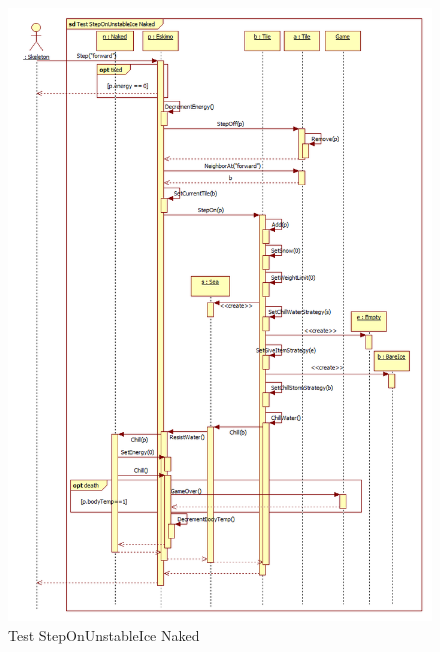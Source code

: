 \begin{figure}[h]
	\begin{center}
		\includegraphics[width=17cm]{chapters/chapter05/diagrams/Test_StepOnUnstableIce_Naked.png}
		\caption{Test StepOnUnstableIce Naked}
		\label{fig:Test StepOnUnstableIce Naked}
	\end{center}
\end{figure}

